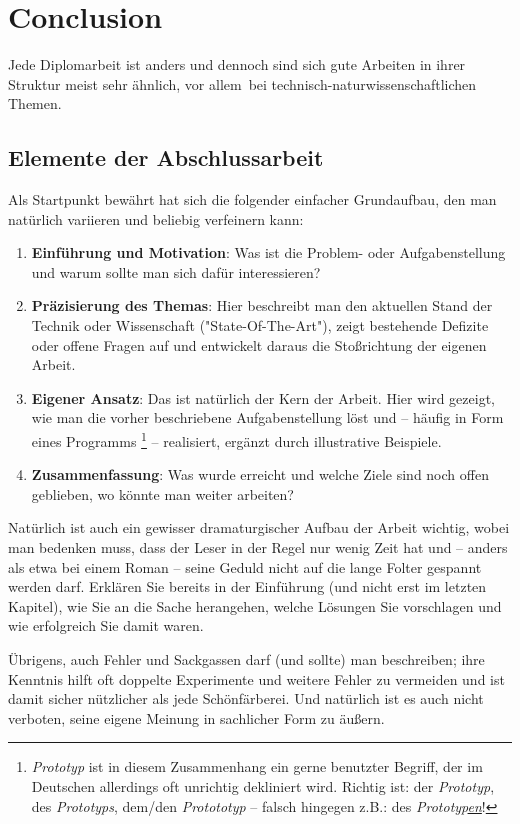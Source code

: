 \chapter{Conclusion}
\label{cha:Diplomschrift}

Jede Diplomarbeit ist anders und dennoch sind sich gute
Arbeiten in ihrer Struktur meist sehr ähnlich, vor allem\ bei
technisch-natur\-wissen\-schaft\-lichen Themen. 

\section{Elemente der Abschlussarbeit}

Als Startpunkt bewährt hat sich die folgender
einfacher Grundaufbau, den man natürlich vari\-ieren und beliebig
verfeinern kann:
%
\begin{enumerate}
\item \textbf{Einführung und Motivation}: Was ist die Problem- oder Aufgabenstellung und
warum sollte man sich dafür interessieren?
\item \textbf{Präzisierung des Themas}: Hier beschreibt man den aktuellen Stand der Technik
oder Wissenschaft ("State-Of-The-Art"), zeigt bestehende
Defizite oder offene Fragen auf und entwickelt daraus die
Stoßrichtung der eigenen Arbeit.
\item \textbf{Eigener Ansatz}: Das ist natürlich der Kern der Arbeit. Hier
wird gezeigt, wie man die vorher beschriebene Aufgabenstellung löst und --
häufig in Form eines Programms%
\footnote{\emph{Prototyp} ist in diesem Zusammenhang ein gerne benutzter Begriff, der im Deutschen
allerdings oft unrichtig dekliniert wird. Richtig ist: der \emph{Prototyp}, des \emph{Prototyps}, dem/den \emph{Protototyp} -- falsch hingegen z.B.: des \emph{Prototyp\underline{en}}!
} --
realisiert, ergänzt durch illustrative Beispiele.
\item \textbf{Zusammenfassung}: Was wurde erreicht und welche Ziele sind
noch offen geblieben, wo könnte man weiter arbeiten?
\end{enumerate}
%
Natürlich ist auch ein gewisser dramaturgischer Aufbau der Arbeit
wichtig, wobei man bedenken muss, dass der Leser in der Regel nur
wenig Zeit hat und -- anders als etwa bei einem Roman -- seine
Geduld nicht auf die lange Folter gespannt werden darf. Erklären
Sie bereits in der Einführung (und nicht erst im letzten Kapitel),
wie Sie an die Sache herangehen, welche Lösungen Sie vorschlagen
und wie erfolgreich Sie damit waren.

Übrigens, auch Fehler und Sackgassen darf (und sollte) man
beschreiben; ihre Kenntnis hilft oft doppelte Experimente und
weitere Fehler zu vermeiden und ist damit sicher nützlicher als
jede Schönfärberei.
Und natürlich ist es auch nicht verboten, seine eigene Meinung 
in sachlicher Form zu äußern.


